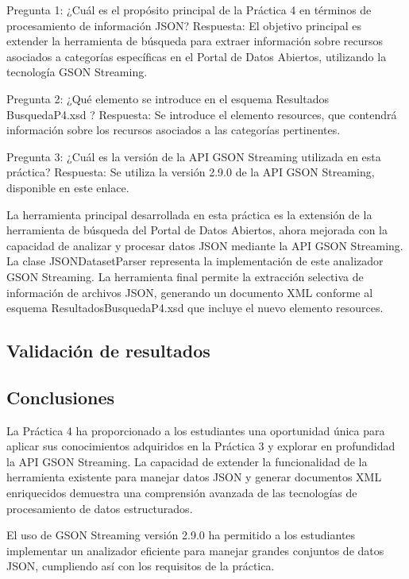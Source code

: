 \noindent Pregunta 1: ¿Cuál es el propósito principal de la Práctica 4 en términos de procesamiento de información JSON?
Respuesta: El objetivo principal es extender la herramienta de búsqueda para extraer información sobre recursos asociados a categorías específicas en el Portal de Datos Abiertos, utilizando la tecnología GSON Streaming.

Pregunta 2: ¿Qué elemento se introduce en el esquema Resultados\\BusquedaP4.xsd ?
Respuesta: Se introduce el elemento resources, que contendrá información sobre los recursos asociados a las categorías pertinentes.

Pregunta 3: ¿Cuál es la versión de la API GSON Streaming utilizada en esta práctica?
Respuesta: Se utiliza la versión 2.9.0 de la API GSON Streaming, disponible en este enlace.


\noindent La herramienta principal desarrollada en esta práctica es la extensión de la herramienta de búsqueda del Portal de Datos Abiertos, ahora mejorada con la capacidad de analizar y procesar datos JSON mediante la API GSON Streaming. La clase JSONDatasetParser representa la implementación de este analizador GSON Streaming. La herramienta final permite la extracción selectiva de información de archivos JSON, generando un documento XML conforme al esquema ResultadosBusquedaP4.xsd que incluye el nuevo elemento resources.

\subsection{Validación de resultados}

\subsection{Conclusiones}

\noindent La Práctica 4 ha proporcionado a los estudiantes una oportunidad única para aplicar sus conocimientos adquiridos en la Práctica 3 y explorar en profundidad la API GSON Streaming. La capacidad de extender la funcionalidad de la herramienta existente para manejar datos JSON y generar documentos XML enriquecidos demuestra una comprensión avanzada de las tecnologías de procesamiento de datos estructurados.

El uso de GSON Streaming versión 2.9.0 ha permitido a los estudiantes implementar un analizador eficiente para manejar grandes conjuntos de datos JSON, cumpliendo así con los requisitos de la práctica.

